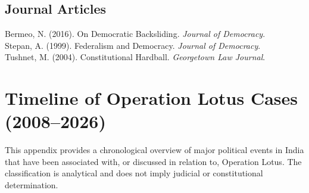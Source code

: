 \documentclass[11pt]{article}
\begin{document}
\subsection*{Journal Articles}
Bermeo, N. (2016). On Democratic Backsliding. \emph{Journal of Democracy}.\\
Stepan, A. (1999). Federalism and Democracy. \emph{Journal of Democracy}.\\
Tushnet, M. (2004). Constitutional Hardball. \emph{Georgetown Law Journal}.

\newpage
\appendix
\section{Timeline of Operation Lotus Cases (2008--2026)}
This appendix provides a chronological overview of major political events in India that have been associated with, or discussed in relation to, Operation Lotus. The classification is analytical and does not imply judicial or constitutional determination.
\end{document}
